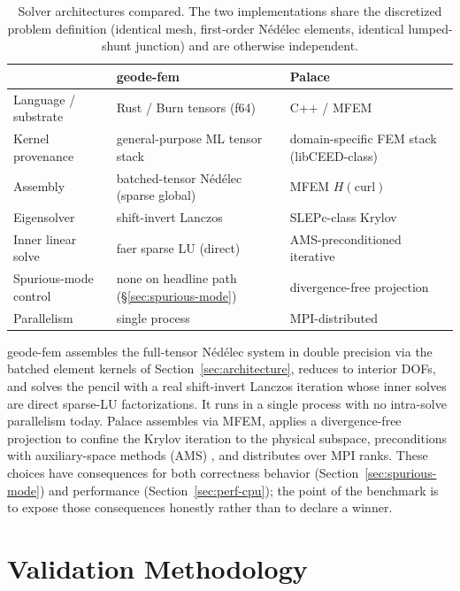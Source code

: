 \documentclass{anvil-paper}
\begin{document}
\begin{table}[t]
  \centering
  \caption{Solver architectures compared. The two implementations share the
  discretized problem definition (identical mesh, first-order
  N\'ed\'elec elements, identical lumped-shunt junction) and are otherwise
  independent.}
  \label{tab:architectures}
  \footnotesize
  \setlength{\tabcolsep}{4pt}
  \begin{tabular}{@{}lll@{}}
    \toprule
     & \textbf{geode-fem} & \textbf{Palace} \\
    \midrule
    Language / substrate & Rust / Burn tensors (f64) & C++ / MFEM \\
    Kernel provenance & general-purpose ML tensor stack &
      domain-specific FEM stack (libCEED-class) \\
    Assembly & batched-tensor N\'ed\'elec (sparse global) &
      MFEM $H(\mathrm{curl})$ \\
    Eigensolver & shift-invert Lanczos & SLEPc-class Krylov \\
    Inner linear solve & faer sparse LU (direct) & AMS-preconditioned iterative \\
    Spurious-mode control & none on headline path (\S\ref{sec:spurious-mode}) &
      divergence-free projection \\
    Parallelism & single process & MPI-distributed \\
    \bottomrule
  \end{tabular}
\end{table}

geode-fem assembles the full-tensor N\'ed\'elec system in double precision
via the batched element kernels of Section~\ref{sec:architecture}, reduces
to interior DOFs, and solves the pencil with a real shift-invert Lanczos
iteration whose inner solves are direct sparse-LU factorizations. It runs
in a single process with no intra-solve parallelism today. Palace
assembles via MFEM, applies a divergence-free projection to confine the
Krylov iteration to the physical subspace, preconditions with
auxiliary-space methods (AMS)
\citep{hiptmair-xu,tzaniovkolevpanayotsvassilevski2018parallel}, and
distributes over MPI ranks. These choices have consequences for both
correctness behavior (Section~\ref{sec:spurious-mode}) and performance
(Section~\ref{sec:perf-cpu}); the point of the benchmark is to expose those
consequences honestly rather than to declare a winner.

\section{Validation Methodology}
\label{sec:methodology}
\end{document}
